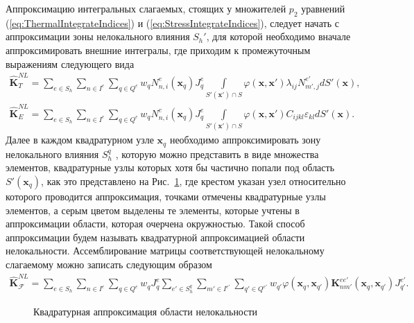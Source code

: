 Аппроксимацию интегральных слагаемых, стоящих у множителей $p_2$ уравнений (\ref{eq:ThermalIntegrateIndices}) и (\ref{eq:StressIntegrateIndices}), следует начать с аппроксимации зоны нелокального влияния $S_h'$, для которой необходимо вначале аппроксимировать внешние интегралы, где приходим к промежуточным выражениям следующего вида
\begin{gather*}
	\widehat{\textbf{K}}^{NL}_T =
	\sum\limits_{e \in S_h}
	\sum\limits_{n \in I^e}
	\sum\limits_{q \in Q^e}
	w_q N_{n,i}^e (\boldsymbol{x}_q) J_q^e
	\int\limits_{S'(\boldsymbol{x}') \cap S}
	\varphi( \boldsymbol{x}, \boldsymbol{x}' )
	\lambda_{ij}
	N_{m', j}^{e'} dS'(\boldsymbol{x}), \\
	\widehat{\textbf{K}}^{NL}_E =
	\sum\limits_{e \in S_h}
	\sum\limits_{n \in I^e}
	\sum\limits_{q \in Q^e}
	w_q N_{n,i}^e (\boldsymbol{x}_q) J_q^e
	\int\limits_{S'(\boldsymbol{x}') \cap S}
	\varphi(\boldsymbol{x}, \boldsymbol{x}') C_{ijkl} \varepsilon_{kl} dS'(\boldsymbol{x}).
\end{gather*}
Далее в каждом квадратурном узле $\boldsymbol{x}_q$ необходимо аппроксимировать зону нелокального влияния $S_h^q$ \cite{Pisano1}, которую можно представить в виде множества элементов, квадратурные узлы которых хотя бы частично попали под область $S'(\boldsymbol{x}_q)$, как это представлено на Рис.~\ref{fig:ApproxSQ}, где крестом указан узел относительно которого проводится аппроксимация, точками отмечены квадратурные узлы элементов, а серым цветом выделены те элементы, которые учтены в аппроксимации области, которая очерчена окружностью. Такой способ аппроксимации будем называть квадратурной аппроксимацией области нелокальности. Ассемблирование матрицы соответствующей нелокальному слагаемому можно записать следующим образом
\begin{gather}
	\label{eq:ApproxNonloc}
	\widehat{\textbf{K}}^{NL}_{\mathcal{F}} =
	\sum\limits_{e \in S_h}
	\sum\limits_{n \in I^e}
	\sum\limits_{q \in Q^e}
	w_q J_q^e
	\sum\limits_{e' \in S_h^q}
	\sum\limits_{m' \in I^{e'}}
	\sum\limits_{q' \in Q^{e'}}
	w_{q'} \varphi(\boldsymbol{x}_q, \boldsymbol{x}_{q'}) 
	\textbf{K}_{nm'}^{e e'}(\boldsymbol{x}_q, \boldsymbol{x}_{q'}) J_{q'}^{e'}.
\end{gather}

\begin{figure}[ht]
    \caption{Квадратурная аппроксимация области нелокальности}\label{fig:ApproxSQ}
\end{figure}

